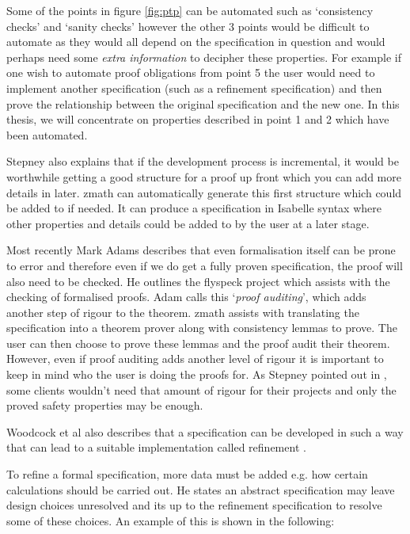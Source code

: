 Some of the points in figure \ref{fig:ptp} can be automated such
as `consistency checks' and `sanity checks' however the other 3 points would be
difficult to automate as they would all depend on the specification in question
and would perhaps need some \emph{extra information} to decipher these
properties. For example if one wish to automate proof obligations from point 5
the user would need to implement another specification (such as a refinement
specification) and then prove the relationship between the original
specification and the new one. In this thesis, we will concentrate on properties
described in point 1 and 2 which have been automated. 

Stepney also explains that if the development process is incremental, it would
be worthwhile getting a good structure for a proof up front which you can add
more details in later. \gls{zmath}  can automatically generate this first
structure which could be added to if needed. It can produce a specification in
Isabelle syntax where other properties and details could be added to by the user
at a later stage.

Most recently Mark Adams \cite{JFR4576} describes that even formalisation itself
can be prone to error and therefore even if we do get a fully proven
specification, the proof will also need to be checked. He outlines the flyspeck
project which assists with the checking of formalised proofs. Adam calls this
`\emph{proof auditing}', which adds another step of rigour to the theorem.
\gls{zmath} assists with translating the specification into a theorem prover
along with consistency lemmas to prove. The user can then choose to prove these
lemmas and the proof audit their theorem. However, even if proof auditing adds
another level of rigour it is important to keep in mind who the user is doing
the proofs for. As Stepney pointed out in \cite{stepney1998tale}, some clients
wouldn't need that amount of rigour for their projects and only the proved
safety properties may be enough.

Woodcock et al also describes that a specification can be developed in such a
way that can lead to a suitable implementation called refinement
\cite{Woodcock:1996:UZS:235337}. 

To refine a formal specification, more data must be added e.g. how certain
calculations should be carried out. He states an abstract specification may
leave design choices unresolved and its up to the refinement specification to
resolve some of these choices. An example of this is shown in the following:

